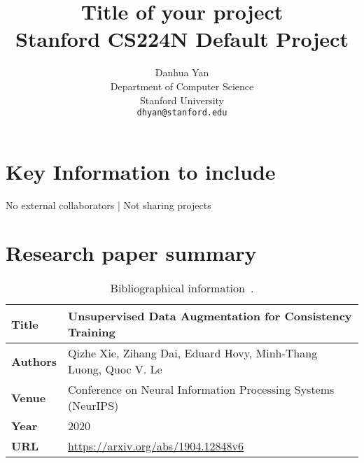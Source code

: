 \documentclass{article}
\title{
  Title of your project \\
  \vspace{1em}
  \small{\normalfont Stanford CS224N Default Project}  %
}
\author{
  Danhua Yan \\
  Department of Computer Science \\
  Stanford University \\
  \texttt{dhyan@stanford.edu} \\
}
\newcommand{\note}[1]{\textcolor{blue}{{#1}}}
\begin{document}
\maketitle





\section{Key Information to include}

No external collaborators | Not sharing projects



\section{Research paper summary}

\begin{table}[h]
    \centering
    \begin{tabular}{ll}
        \toprule
        \textbf{Title} & Unsupervised Data Augmentation for Consistency Training \\
        \midrule
        \textbf{Authors} &  Qizhe Xie, Zihang Dai, Eduard Hovy, Minh-Thang Luong, Quoc V. Le \\
        \textbf{Venue} & Conference on Neural Information Processing Systems (NeurIPS) \\
        \textbf{Year}  & 2020 \\
        \textbf{URL}   & \url{https://arxiv.org/abs/1904.12848v6} \\
        \bottomrule
    \end{tabular}
    \vspace{1em}
    \caption{Bibliographical information~\cite{xie2020unsupervised}.}
\end{table}
\end{document}
